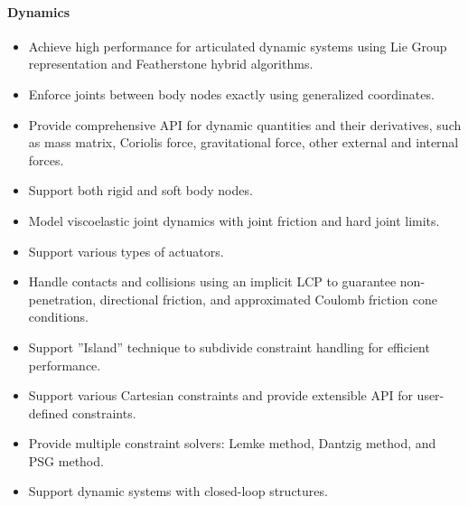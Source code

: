 \paragraph{Dynamics}
\begin{itemize}[leftmargin=*] \itemsep1pt \parskip0pt 
  \item Achieve high performance for articulated dynamic systems using Lie Group representation and Featherstone hybrid algorithms.
  \item Enforce joints between body nodes exactly using generalized coordinates.
  \item Provide comprehensive API for dynamic quantities and their derivatives, such as mass matrix, Coriolis force, gravitational force, other external and internal forces.
  \item Support both rigid and soft body nodes.
  \item Model viscoelastic joint dynamics with joint friction and hard joint limits.
  \item Support various types of actuators.
  \item Handle contacts and collisions using an implicit LCP to guarantee non-penetration, directional friction, and approximated Coulomb friction cone conditions.
  \item Support ''Island'' technique to subdivide constraint handling for efficient performance.
  \item Support various Cartesian constraints and provide extensible API for user-defined constraints.
  \item Provide multiple constraint solvers: Lemke method, Dantzig method, and PSG method.
  \item Support dynamic systems with closed-loop structures.
\end{itemize}
